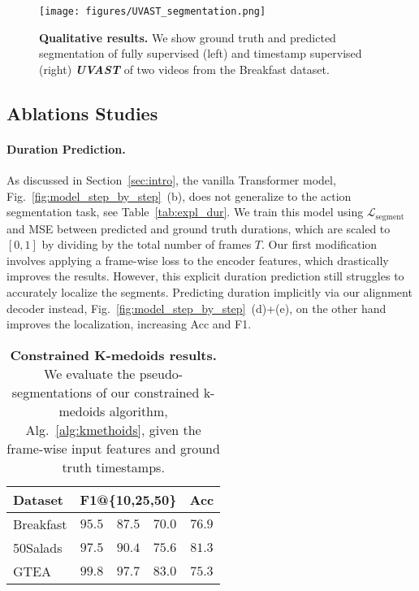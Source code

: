 \begin{figure}
\begin{minipage}{\linewidth}
    \centering
    \texttt{[image: figures/UVAST\_segmentation.png]}
    \caption{\textbf{Qualitative results.} We show ground truth and predicted segmentation of fully supervised (left) and timestamp supervised (right) \textit{\textbf{UVAST}} of two videos from the Breakfast dataset.}
    \label{fig:qualitative}
\end{minipage}
\end{figure}

\subsection{Ablations Studies}
\paragraph{Duration Prediction.}
As discussed in Section~\ref{sec:intro}, the vanilla Transformer model, Fig.~\ref{fig:model_step_by_step}~(b),  does not generalize to the action segmentation task, see Table~\ref{tab:expl_dur}. We train this model using $\mathcal{L}_{\text{segment}}$ and MSE between predicted and ground truth durations, which are scaled to $[0, 1]$ by dividing by the total number of frames $T$.
Our first modification involves applying a frame-wise loss to the encoder features, which drastically improves the results. However, this explicit duration prediction still struggles to accurately localize the segments. 
Predicting duration implicitly via our alignment decoder instead, Fig.~\ref{fig:model_step_by_step}~(d)+(e), on the other hand improves the localization, increasing Acc and F1.

\begin{table}[h]
\centering
\caption{\textbf{Constrained K-medoids results.} We evaluate the pseudo-segmentations of our constrained k-medoids algorithm, Alg.~\ref{alg:kmethoids}, given the frame-wise input features and ground truth timestamps.}
\label{table:kmethoids}
\resizebox{1.6 in}{!} {
\begin{tabular}{l|ccc|c}
\hline 
\hline 
Dataset & \multicolumn{3}{c|}{F1@\{10,25,50\}} & Acc \\
\hline 
Breakfast & $95.5$ & $87.5$ & $70.0$ & $76.9$\\
50Salads & $97.5$ & $90.4$ & $75.6$ & $81.3$\\
GTEA & $99.8$ & $97.7$ & $83.0$ & $75.3$\\
\hline 
\hline 
\end{tabular}
}
\end{table}

